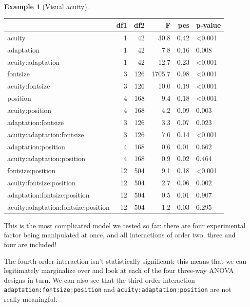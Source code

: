 \documentclass[
  11pt,
  letterpaper,
]{scrbook}
\theoremstyle{definition}
\newtheorem{example}{Example}[chapter]
\theoremstyle{remark}
\begin{document}
\begin{example}[Visual
acuity]
\begin{table}
\centering
\begin{tabular}{lrrrrl}
\toprule
  & df1 & df2 & F & pes & p-value\\
\midrule
acuity & 1 & 42 & 30.8 & 0.42 & <0.001\\
adaptation & 1 & 42 & 7.8 & 0.16 & 0.008\\
acuity:adaptation & 1 & 42 & 12.7 & 0.23 & <0.001\\
fontsize & 3 & 126 & 1705.7 & 0.98 & <0.001\\
acuity:fontsize & 3 & 126 & 10.0 & 0.19 & <0.001\\
\addlinespace
position & 4 & 168 & 9.4 & 0.18 & <0.001\\
acuity:position & 4 & 168 & 4.2 & 0.09 & 0.003\\
adaptation:fontsize & 3 & 126 & 3.3 & 0.07 & 0.023\\
acuity:adaptation:fontsize & 3 & 126 & 7.0 & 0.14 & <0.001\\
adaptation:position & 4 & 168 & 0.6 & 0.01 & 0.662\\
\addlinespace
acuity:adaptation:position & 4 & 168 & 0.9 & 0.02 & 0.464\\
fontsize:position & 12 & 504 & 9.1 & 0.18 & <0.001\\
acuity:fontsize:position & 12 & 504 & 2.7 & 0.06 & 0.002\\
adaptation:fontsize:position & 12 & 504 & 0.5 & 0.01 & 0.907\\
acuity:adaptation:fontsize:position & 12 & 504 & 1.2 & 0.03 & 0.295\\
\bottomrule
\end{tabular}
\end{table}

This is the most complicated model we tested so far: there are four
experimental factor being manipulated at once, and all interactions of
order two, three and four are included!

The fourth order interaction isn't statistically significant: this means
that we can legitimately marginalize over and look at each of the four
three-way ANOVA designs in turn. We can also see that the third order
interaction \texttt{adaptation:fontsize:position} and
\texttt{acuity:adaptation:position} are not really meaningful.


\end{example}
\end{document}
